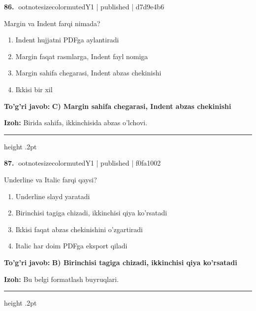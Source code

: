 \documentclass[10pt,a4paper]{article}
\begin{document}
\textbf{\color{ink}86.} {ootnotesizecolor{muted}Y1 | published | d7d9e4b6}
\par
Margin va Indent farqi nimada?
\begin{enumerate}[label=\Alph*),leftmargin=9mm]
\item Indent hujjatni PDFga aylantiradi
\item Margin faqat rasmlarga, Indent fayl nomiga
\item Margin sahifa chegarasi, Indent abzas chekinishi
\item Ikkisi bir xil
\end{enumerate}
\begin{tcolorbox}[enhanced,breakable,colback=teal!4,colframe=teal!55!black,boxrule=0.45pt,arc=1.2mm,left=2.8mm,right=2.8mm,top=2mm,bottom=2mm]
\textbf{\color{teal}To'g'ri javob:} \textbf{C) Margin sahifa chegarasi, Indent abzas chekinishi}
\par\smallskip
\textbf{Izoh:} Birida sahifa, ikkinchisida abzas o'lchovi.
\end{tcolorbox}
\vspace{2mm}\hrule height .2pt\vspace{2mm}

\textbf{\color{ink}87.} {ootnotesizecolor{muted}Y1 | published | f0fa1002}
\par
Underline va Italic farqi qaysi?
\begin{enumerate}[label=\Alph*),leftmargin=9mm]
\item Underline slayd yaratadi
\item Birinchisi tagiga chizadi, ikkinchisi qiya ko'rsatadi
\item Ikkisi faqat abzas chekinishini o'zgartiradi
\item Italic har doim PDFga eksport qiladi
\end{enumerate}
\begin{tcolorbox}[enhanced,breakable,colback=teal!4,colframe=teal!55!black,boxrule=0.45pt,arc=1.2mm,left=2.8mm,right=2.8mm,top=2mm,bottom=2mm]
\textbf{\color{teal}To'g'ri javob:} \textbf{B) Birinchisi tagiga chizadi, ikkinchisi qiya ko'rsatadi}
\par\smallskip
\textbf{Izoh:} Bu belgi formatlash buyruqlari.
\end{tcolorbox}
\vspace{2mm}\hrule height .2pt\vspace{2mm}
\end{document}
